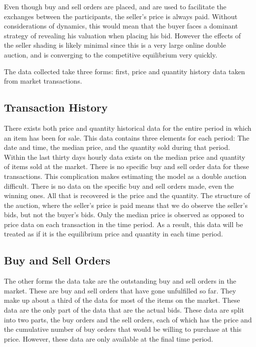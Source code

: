 \documentclass[12pt, letterpaper]{paper}
\begin{document}
Even though buy and sell orders are placed, and are used to
facilitate the exchanges between the participants, the seller's price
is always paid. Without considerations of dynamics, this would mean
that the buyer faces a dominant strategy of revealing his valuation
when placing his bid. However the effects of the seller shading is
likely minimal since this is a very large online double auction,
and is converging to the competitive equilibrium very quickly.

The data collected take three forms: first, price and
quantity history data taken from market transactions. 

\subsection{Transaction History}
\label{sec-3-1}

There exists both price and quantity historical data for the entire
period in which an item has been for sale. This data contains three
elements for each period: The date and time, the median price, and the
quantity sold during that period. Within the last thirty days hourly
data exists on the median price and quantity of items sold at the
market. There is no specific buy and sell order data for these
transactions. This complication makes estimating the model as a double
auction difficult. There is no data on the specific buy and sell
orders made, even the winning ones. All that is recovered is the price
and the quantity. The structure of the auction, where the seller's
price is paid means that we do observe the seller's bids, but not the
buyer's bids. Only the median price is observed as opposed to price
data on each transaction in the time period. As a result, this data
will be treated as if it is the equilibrium price and quantity in each
time period.

\subsection{Buy and Sell Orders}
\label{sec-3-2}

The other forms the data take are the outstanding buy and sell orders
in the market. These are buy and sell orders that have gone
unfulfilled so far. They make up about a third of the data for most of
the items on the market. These data are the
only part of the data that are the actual bids. These data are split into
two parts, the buy orders and the sell orders, each of which has the
price and the cumulative number of buy orders that would be willing to
purchase at this price. However, these data are only available at the
final time period. 
\end{document}
